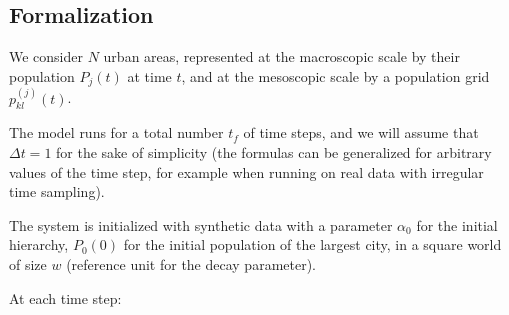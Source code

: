 \documentclass[11pt]{article}
\begin{document}
\subsection{Formalization}


We consider $N$ urban areas, represented at the macroscopic scale by their population $P_j(t)$ at time $t$, and at the mesoscopic scale by a population grid $p_{kl}^{(j)}(t)$.

The model runs for a total number $t_f$ of time steps, and we will assume that $\Delta t = 1$ for the sake of simplicity (the formulas can be generalized for arbitrary values of the time step, for example when running on real data with irregular time sampling).

The system is initialized with synthetic data with a parameter $\alpha_0$ for the initial hierarchy, $P_0 (0)$ for the initial population of the largest city, in a square world of size $w$ (reference unit for the decay parameter).

At each time step:
\end{document}
